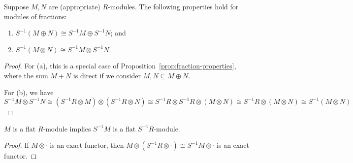 
\begin{proposition}\label{prop:fraction-tensor}
    Suppose \(M,N\) are (appropriate) \(R\)-modules.
    The following properties hold for modules of fractions:
    \begin{enumerate}[label={(\alph*)}, itemsep=0mm]
        \item \(S^{-1}(M \oplus N) \cong S^{-1}M \oplus S^{-1}N\); and
        \item \(S^{-1}(M \otimes N) \cong S^{-1}M \otimes S^{-1}N\).
    \end{enumerate}
\end{proposition}
\begin{proof}
    For (a), this is a special case of Proposition~\ref{prop:fraction-properties},
    where the sum \(M + N\) is direct if we consider \(M,N \subseteq M \oplus N\).

    For (b), we have
    \begin{equation*}
        S^{-1}M \otimes S^{-1}N \cong (S^{-1}R \otimes M) \otimes (S^{-1}R \otimes N)
        \cong S^{-1}R \otimes S^{-1}R \otimes (M \otimes N)
        \cong S^{-1}R \otimes (M \otimes N)
        \cong S^{-1}(M \otimes N)
    \end{equation*}
\end{proof}
\begin{proposition}\label{prop:localization-flat}
    \(M\) is a flat \(R\)-module implies \(S^{-1}M\) is a flat \(S^{-1}R\)-module.
\end{proposition}
\begin{proof}
    If \(M \otimes \cdot\) is an exact functor,
    then \(M \otimes (S^{-1}R \otimes \cdot) \cong S^{-1}M \otimes \cdot\) is an exact functor.
\end{proof}
    

